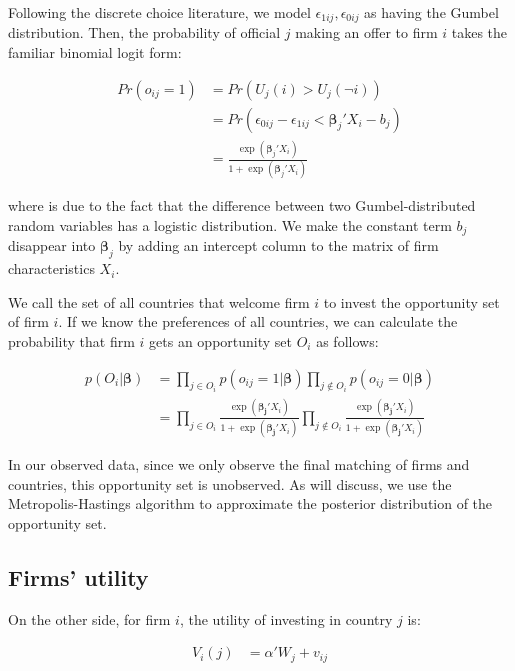 Following the discrete choice literature, we model $\epsilon_{1ij}, \epsilon_{0ij}$ as having the Gumbel distribution. Then, the probability of official $j$ making an offer to firm $i$ takes the familiar binomial logit form:

\begin{align}
Pr(o_{ij} = 1) &= Pr(U_j(i) > U_j(\neg i)) \\
&= Pr(\epsilon_{0ij} - \epsilon_{1ij} <  \bm{\beta}_j ' X_i - b_j) \\
&= \frac{\exp({\bm{\beta}_j'X_i})}{1 + \exp({\bm{\beta}_j'X_i})} \label{eq:prob_offer_ij}
\end{align}

where  is due to the fact that the difference between two Gumbel-distributed random variables has a logistic distribution. We make the constant term $b_j$ disappear into $\bm{\beta}_j$ by adding an intercept column to the matrix of firm characteristics $X_i$.

We call the set of all countries that welcome firm $i$ to invest the opportunity set of firm $i$. If we know the preferences of all countries, we can calculate the probability that firm $i$ gets an opportunity set $O_i$ as follows:

\begin{align}
p(O_i | \bm{\beta}) &= \prod_{j \in O_i} p(o_{ij} = 1 | \bm{\beta}) \prod_{j \notin O_i} p(o_{ij} = 0 | \bm{\beta}) \\
&= \prod_{j \in O_i} \frac{\exp(\bm{\beta_j} ' X_i)}{1 + \exp(\bm{\beta_j}' X_i)}
 \prod_{j \notin O_i} \frac{\exp(\bm{\beta_j} ' X_i)}{1 + \exp(\bm{\beta_j}' X_i)} \label{eq:conditional_probability_of_offer}
\end{align}

In our observed data, since we only observe the final matching of firms and countries, this opportunity set is unobserved. As  will discuss, we use the Metropolis-Hastings algorithm to approximate the posterior distribution of the opportunity set.

\subsection{Firms' utility}

On the other side, for firm $i$, the utility of investing in country $j$ is:

\begin{align}
V_i(j) &= \alpha' W_{j} + v_{ij}
\end{align}

